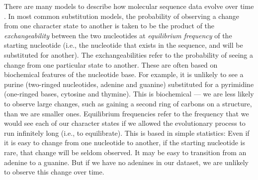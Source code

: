 \documentclass[11pt]{article}
\begin{document}
There are many models to describe how molecular sequence data evolve over time \cite{Jukes1969, Kimura1980, Felsenstein1981, Hasegawa1985, Tavare1986}.
In most common substitution models, the probability of observing a change from one character state to another is taken to be the product of the \textit{exchangeability} between the two nucleotides at \textit{equilibrium frequency} of the starting nucleotide (i.e., the nucleotide that exists in the sequence, and will be substituted for another). 
The exchangeabilities refer to the probability of seeing a change from one particular state to another.
These are often based on biochemical features of the nucleotide base.
For example, it is unlikely to see a purine (two-ringed nucleotides, adenine and guanine) substituted for a pyrimidine (one-ringed bases, cytosine and thymine). 
This is biochemical --- we are less likely to observe large changes, such as gaining a second ring of carbons on a structure, than we are smaller ones.
Equilibrium frequencies refer to the frequency that we would see each of our character states if we allowed the evolutionary process to run infinitely long (i.e., to equilibrate).
This is based in simple statistics: Even if it is easy to change from one nucleotide to another, if the starting nucleotide is rare, that change will be seldom observed.
It may be easy to transition from an adenine to a guanine.
But if we have no adenines in our dataset, we are unlikely to observe this change over time.
\clearpage
\end{document}
